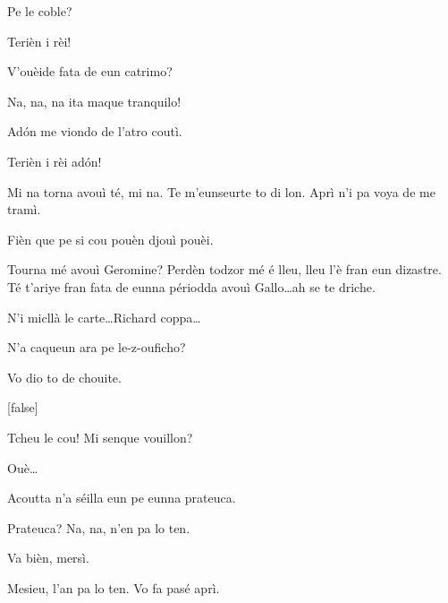 \begin{drama}
\Gerominespeaks Pe le coble?

\Tuenospeaks Terièn i rèi!

\Spritzspeaks{} V'ouèide fata de eun catrimo?

\Tcheuttespeaks Na, na, na ita maque tranquilo!

\Spritzspeaks Ad\'on me viondo de l'atro coutì.


\Tuenospeaks Terièn i rèi ad\'on!


\Gerominespeaks Mi na torna avouì té, mi na. Te m'eunseurte to di lon. Aprì n'i pa voya de me tramì.

\Saventaspeaks Fièn que pe si cou pouèn djouì pouèi.

\Richardspeaks Tourna mé avouì Geromine? Perdèn todzor mé é lleu, lleu l'è fran eun dizastre.  Té t'ariye fran fata de eunna périodda avouì Gallo\ldots ah se te driche.

\Tuenospeaks N'i micllà le carte\ldots Richard coppa\ldots





\Genespeaks{} N'a caqueun ara pe le-z-ouficho?

\Sandrinospeaks Vo dio to de chouite.


{}[false]

\Tuenospeaks Tcheu le cou! Mi senque vouillon?


\Tuenospeaks Ouè\ldots

\Sandrinospeaks Acoutta n'a séilla eun pe eunna prateuca.

\Tuenospeaks Prateuca? Na, na, n'en pa lo ten.

\Sandrinospeaks Va bièn, mersì.


\Sandrinospeaks{} Mesieu, l'an pa lo ten. Vo fa pasé aprì.


\end{drama}
